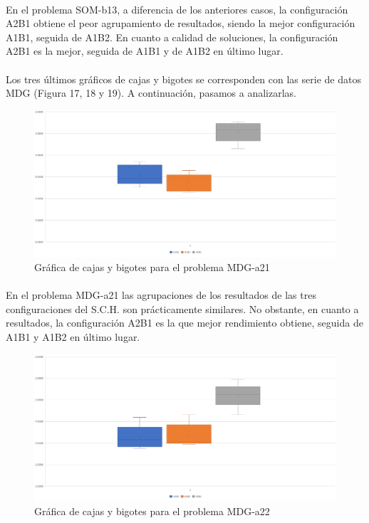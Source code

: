 	\paragraph{}En el problema SOM-b13, a diferencia de los anteriores casos, la configuración A2B1 obtiene el peor agrupamiento de resultados, siendo la mejor configuración A1B1, seguida de A1B2. En cuanto a calidad de soluciones, la configuración A2B1 es la mejor, seguida de A1B1 y de A1B2 en último lugar.
	
	\paragraph{}Los tres últimos gráficos de cajas y bigotes se corresponden con las serie de datos MDG (Figura 17, 18 y 19). A continuación, pasamos a analizarlas.

	\begin{figure}[H]
		\centering
		\includegraphics[scale=0.3]{img/BIGOTESMDG1.png}
		\caption{Gráfica de cajas y bigotes para el problema MDG-a21}
		\label{MDG-a21_bigotes}
	\end{figure}

	\paragraph{}En el problema MDG-a21 las agrupaciones de los resultados de las tres configuraciones del S.C.H. son prácticamente similares. No obstante, en cuanto a resultados, la configuración A2B1 es la que mejor rendimiento obtiene, seguida de A1B1 y A1B2 en último lugar.

	\begin{figure}[H]
		\centering
		\includegraphics[scale=0.3]{img/BIGOTESMDG2.png}
		\caption{Gráfica de cajas y bigotes para el problema MDG-a22}
		\label{MDG-a22_bigotes}
	\end{figure}

